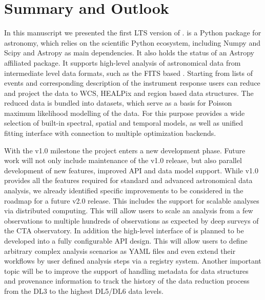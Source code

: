 \documentclass[traditabstract, longauth]{aa}
\begin{document}
\section{Summary and Outlook}
\label{sec:summary-and-outlook}
%
In this manuscript we presented the first LTS version of \gammapy.
\gammapy is a Python package for \gammaray astronomy, which relies on the
scientific Python ecosystem, including Numpy and Scipy and Astropy as
main dependencies. It also holds the status of an Astropy affiliated
package. It supports high-level analysis of astronomical \gammaray
data from intermediate level data formats, such as the FITS based
\gadf. Starting from lists of \gammaray events and corresponding description
of the instrument response users can reduce and project the data
to WCS, HEALPix and region based data structures. The reduced data is bundled
into datasets, which serve as a basis for Poisson maximum likelihood
modelling of the data. For this purpose \gammapy provides a wide selection
of built-in spectral, spatial and temporal models, as well as unified
fitting interface with connection to multiple optimization backends.

With the v1.0 milestone the \gammapy project enters a new development
phase. Future work will not only include maintenance of the v1.0 release,
but also parallel development of new features, improved API and data
model support. While v1.0 provides all the features required for
standard and advanced astronomical \gammaray data analysis,
we already identified specific improvements to be considered in the
roadmap for a future v2.0 release. This includes the support for
scalable analyses via distributed computing. This will allow
users to scale an analysis from a few observations to multiple
hundreds of observations as expected by deep surveys of the CTA
observatory. In addition the high-level interface
of \gammapy is planned to be developed into a fully configurable
API design. This will allow users to define arbitrary complex analysis
scenarios as YAML files and even extend their workflows by user defined
analysis steps via a registry system. Another important topic will
be to improve the support of handling metadata for data structures
and provenance information to track the history of the data reduction
process from the DL3 to the highest DL5/DL6 data levels.
\end{document}
